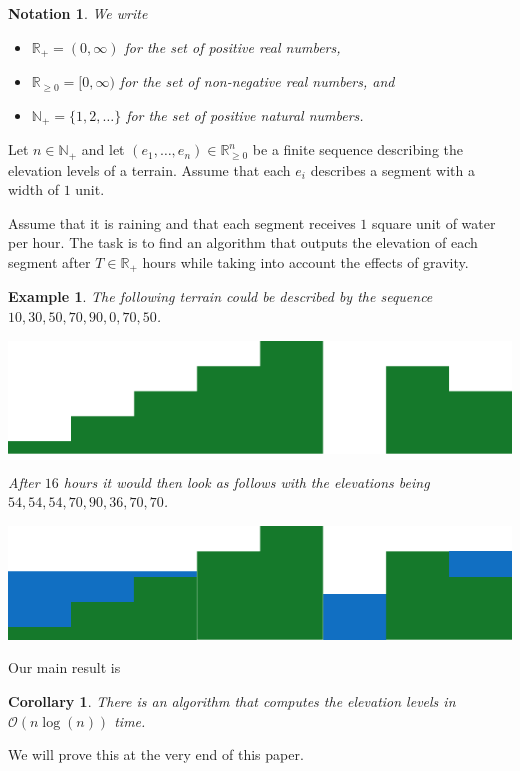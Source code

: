 \documentclass[11pt,a4paper]{article}
\newtheorem{ex}{Example}
\newtheorem{nota}{Notation}
\newtheorem{cor}{Corollary}
\newcommand{\Np}{\mathbb{N}_+}
\newcommand{\bO}{\mathcal{O}}
\newcommand{\Rp}{\mathbb{R}_+}
\newcommand{\Rnn}{\mathbb{R}_{\ge0}}
\begin{document}
\begin{nota}
  We write
  \begin{itemize}
    \item $\Rp = (0, \infty)$ for the set of positive real numbers,
    \item $\Rnn = [0, \infty)$ for the set of non-negative real numbers, and
    \item $\Np = \{ 1, 2, \ldots \}$ for the set of positive natural numbers.
  \end{itemize}
\end{nota}

Let $n\in\Np$ and let  $(e_1, \ldots, e_n) \in \Rnn^n$ be a finite sequence describing the elevation levels of a terrain.
Assume that each $e_i$ describes a segment with a width of $1$ unit.

Assume that it is raining and that each segment receives $1$ square unit of water per hour.
The task is to find an algorithm that outputs the elevation of each segment after $T\in\Rp$ hours while taking into account the effects of gravity.

\begin{ex}
  The following terrain could be described by the sequence $10, 30, 50, 70, 90, 0, 70, 50$.
  \begin{center}
    \includegraphics{im1.pdf}
  \end{center}
  After $16$ hours it would then look as follows with the elevations being $54, 54, 54, 70, 90, 36, 70, 70$.
  \begin{center}
    \includegraphics{im2.pdf}
  \end{center}
\end{ex}

Our main result is
\begin{cor}
\label{mainresult}
There is an algorithm that computes the elevation levels in $\bO(n\log(n))$ time.
\end{cor}
We will prove this at the very end of this paper.
\end{document}
